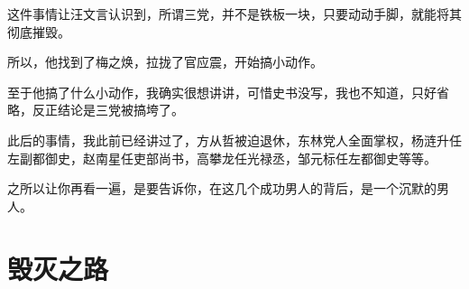 \begin{multicols}{\theparacolNo}
		这件事情让汪文言认识到，所谓三党，并不是铁板一块，只要动动手脚，就能将其彻底摧毁。

		所以，他找到了梅之焕，拉拢了官应震，开始搞小动作。

		至于他搞了什么小动作，我确实很想讲讲，可惜史书没写，我也不知道，只好省略，反正结论是三党被搞垮了。

		此后的事情，我此前已经讲过了，方从哲被迫退休，东林党人全面掌权，杨涟升任左副都御史，赵南星任吏部尚书，高攀龙任光禄丞，邹元标任左都御史等等。

		之所以让你再看一遍，是要告诉你，在这几个成功男人的背后，是一个沉默的男人。

		\ifnum{}
	\end{multicols}
\fi
\newpage
\section{毁灭之路}
\ifnum{}
